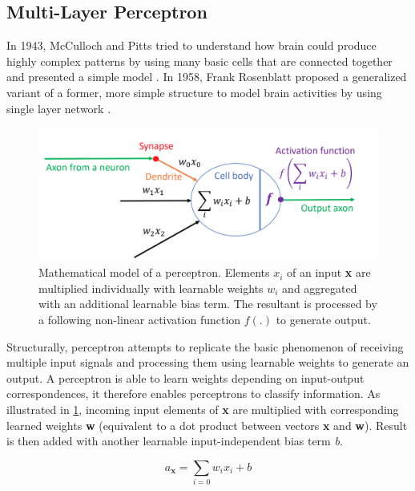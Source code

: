 \subsection{Multi-Layer Perceptron}


In 1943, McCulloch and Pitts tried to understand how brain could produce highly complex patterns by using many basic cells that are connected together and presented a simple model \cite{Arbib2004}. In 1958, Frank Rosenblatt proposed a generalized variant of a former, more simple structure to model brain activities by using single layer network \cite{Rosenblatt1958}. 



\begin{figure}[!ht]
	 \centering 
\includegraphics[scale = 0.2]{Graphics/Fundamentals/perceptron1} 
	\caption[Mathematical model of a Perceptron]{Mathematical model of a perceptron. Elements $x_i$ of an input \textbf{x} are multiplied individually with learnable weights $w_i$ and aggregated with an additional learnable bias term. The resultant is processed by a following non-linear activation function $f(.)$ to generate output. \cite{CS231n} }
	\label{fig: perceptron} 
\end{figure}
Structurally, perceptron attempts to replicate the basic phenomenon of receiving multiple input signals and processing them using learnable weights to generate an output.  A perceptron is able to learn weights depending on input-output correspondences, it therefore enables perceptrons to classify information.
As illustrated in \ref{fig: perceptron}, incoming input elements of \textbf{x} are multiplied with corresponding learned weights \textbf{w} (equivalent to a dot product between vectors \textbf{x} and \textbf{w}). Result is then added with another learnable input-independent bias term \textit{b}. 


\begin{equation}a_{\mathbf{x}}=\sum_{i=0} w_{i} x_{i}+b\end{equation}

